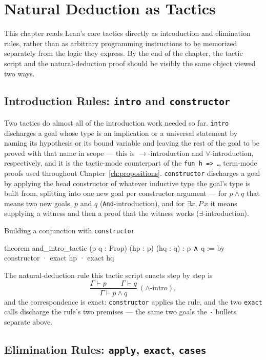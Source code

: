 \chapter{Natural Deduction as Tactics}
\label{ch:natural-deduction}

This chapter reads Lean's core tactics directly as introduction and
elimination rules, rather than as arbitrary programming instructions
to be memorized separately from the logic they express. By the end
of the chapter, the tactic script and the natural-deduction proof
should be visibly the same object viewed two ways.

\section{Introduction Rules: \texttt{intro} and \texttt{constructor}}

Two tactics do almost all of the introduction work needed so far.
\texttt{intro} discharges a goal whose type is an implication or a
universal statement by naming its hypothesis or its bound variable
and leaving the rest of the goal to be proved with that name in
scope — this is $\to$-introduction and $\forall$-introduction,
respectively, and it is the tactic-mode counterpart of the
\texttt{fun h => \ldots} term-mode proofs used throughout
Chapter~\ref{ch:propositions}. \texttt{constructor} discharges a
goal by applying the head constructor of whatever inductive type the
goal's type is built from, splitting into one new goal per
constructor argument — for $p \land q$ that means two new goals, $p$
and $q$ (\texttt{And}-introduction), and for $\exists x, P\,x$ it
means supplying a witness and then a proof that the witness works
($\exists$-introduction).

\begin{experiment}{Building a conjunction with \texttt{constructor}}
\begin{lean}
theorem and_intro_tactic (p q : Prop) (hp : p) (hq : q) : p ∧ q := by
  constructor
  · exact hp
  · exact hq
\end{lean}
The natural-deduction rule this tactic script enacts step by step is
\[
\dfrac{\Gamma \vdash p \qquad \Gamma \vdash q}{\Gamma \vdash p \land q}
\ (\land\text{-intro}),
\]
and the correspondence is exact: \texttt{constructor} applies the
rule, and the two \texttt{exact} calls discharge the rule's two
premises — the same two goals the \texttt{·} bullets separate above.
\end{experiment}

\section{Elimination Rules: \texttt{apply}, \texttt{exact}, \texttt{cases}}

